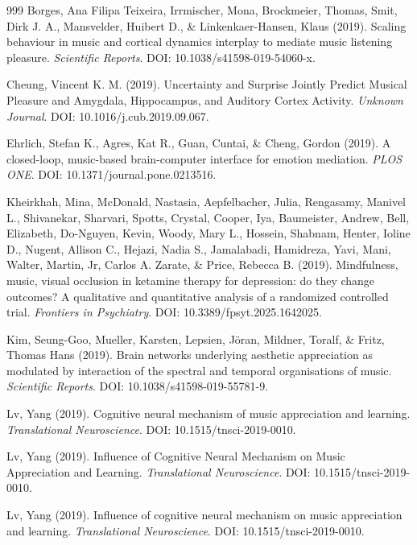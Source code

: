\documentclass[9pt,onecolumn]{article}
\begin{document}
\begin{thebibliography}{999}
Borges, Ana Filipa Teixeira, Irrmischer, Mona, Brockmeier, Thomas, Smit, Dirk J. A., Mansvelder, Huibert D., \& Linkenkaer-Hansen, Klaus (2019). Scaling behaviour in music and cortical dynamics interplay to mediate music listening pleasure. \textit{Scientific Reports}. DOI: 10.1038/s41598-019-54060-x.

Cheung, Vincent K. M. (2019). Uncertainty and Surprise Jointly Predict Musical Pleasure and Amygdala, Hippocampus, and Auditory Cortex Activity. \textit{Unknown Journal}. DOI: 10.1016/j.cub.2019.09.067.

Ehrlich, Stefan K., Agres, Kat R., Guan, Cuntai, \& Cheng, Gordon (2019). A closed-loop, music-based brain-computer interface for emotion mediation. \textit{PLOS ONE}. DOI: 10.1371/journal.pone.0213516.

Kheirkhah, Mina, McDonald, Nastasia, Aepfelbacher, Julia, Rengasamy, Manivel L., Shivanekar, Sharvari, Spotts, Crystal, Cooper, Iya, Baumeister, Andrew, Bell, Elizabeth, Do-Nguyen, Kevin, Woody, Mary L., Hossein, Shabnam, Henter, Ioline D., Nugent, Allison C., Hejazi, Nadia S., Jamalabadi, Hamidreza, Yavi, Mani, Walter, Martin, Jr, Carlos A. Zarate, \& Price, Rebecca B. (2019). Mindfulness, music, visual occlusion in ketamine therapy for depression: do they change outcomes? A qualitative and quantitative analysis of a randomized controlled trial. \textit{Frontiers in Psychiatry}. DOI: 10.3389/fpsyt.2025.1642025.

Kim, Seung-Goo, Mueller, Karsten, Lepsien, Jöran, Mildner, Toralf, \& Fritz, Thomas Hans (2019). Brain networks underlying aesthetic appreciation as modulated by interaction of the spectral and temporal organisations of music. \textit{Scientific Reports}. DOI: 10.1038/s41598-019-55781-9.

Lv, Yang (2019). Cognitive neural mechanism of music appreciation and learning. \textit{Translational Neuroscience}. DOI: 10.1515/tnsci-2019-0010.

Lv, Yang (2019). Influence of Cognitive Neural Mechanism on Music Appreciation and Learning. \textit{Translational Neuroscience}. DOI: 10.1515/tnsci-2019-0010.

Lv, Yang (2019). Influence of cognitive neural mechanism on music appreciation and learning. \textit{Translational Neuroscience}. DOI: 10.1515/tnsci-2019-0010.


\end{thebibliography}
\end{document}
